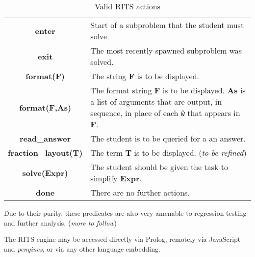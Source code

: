 \documentclass[a4paper,11pt]{article}
\begin{document}
\begin{table}[ht]
  \centering
  \begin{tabular}{cp{7cm}}
    \hline
    \textbf{enter} & Start of a subproblem that the student must solve.\\
    \textbf{exit} & The most recently spawned subproblem was solved.\\
    \textbf{format(F)} & The string \textbf{F} is to be displayed.\\
    \textbf{format(F,As)} & The format string \textbf{F} is to be displayed. \textbf{As} is a list of arguments that are output, in sequence, in place of each \texttt{\~ w} that appears in \textbf{F}.\\
    \textbf{read\_answer} & The student is to be queried for a an answer.\\
    \textbf{fraction\_layout(T)} & The term \textbf{T} is to be displayed. (\textit{to be refined})\\
    \textbf{solve(Expr)} & The student should be given the task to simplify \textbf{Expr}.\\
    \textbf{done} & There are no further actions.\\
    \hline
  \end{tabular}
\caption{Valid RITS actions}
  \label{tab:ritsactions}
\end{table}


\vspace{0.7cm}

Due to their purity, these predicates are also very amenable to
regression testing and further analysis. (\textit{more to follow})

\vspace{0.7cm}

The RITS engine may be accessed directly via Prolog, remotely via
JavaScript and \textit{pengines}, or via any other language embedding.

\vfil
\end{document}
